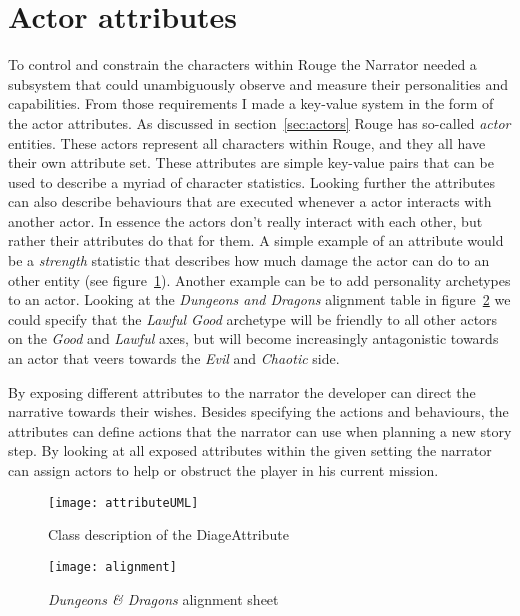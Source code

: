 \section{Actor attributes}
To control and constrain the characters within Rouge the Narrator needed a subsystem that could unambiguously observe and measure their personalities and capabilities. 
From those requirements I made a key-value system in the form of the actor attributes.
As discussed in section~\ref{sec:actors} Rouge has so-called \textit{actor} entities. These actors represent all characters within Rouge, and they all have their own attribute set. 
These attributes are simple key-value pairs that can be used to describe a myriad of character statistics. 
Looking further the attributes can also describe behaviours that are executed whenever a actor interacts with another actor.
In essence the actors don't really interact with each other, but rather their attributes do that for them.
A simple example of an attribute would be a \textit{strength} statistic that describes how much damage the actor can do to an other entity (see figure~\ref{fig:attributeUML}).
Another example can be to add personality archetypes to an actor.
Looking at the \textit{Dungeons and Dragons} alignment table in figure~\ref{fig:dnd} we could specify that the \textit{Lawful Good} archetype will be friendly to all other actors on the \textit{Good} and \textit{Lawful} axes, but will become increasingly antagonistic towards an actor that veers towards the \textit{Evil} and \textit{Chaotic} side.

By exposing different attributes to the narrator the developer can direct the narrative towards their wishes.
Besides specifying the actions and behaviours, the attributes can define actions that the narrator can use when planning a new story step. By looking at all exposed attributes within the given setting the narrator can assign actors to help or obstruct the player in his current mission.
\begin{figure}[p]
 \texttt{[image: attributeUML]}
 \caption{Class description of the DiageAttribute}\label{fig:attributeUML}
\end{figure}
\begin{figure}[p]
	\texttt{[image: alignment]}
	\caption{\textit{Dungeons \& Dragons} alignment sheet}\label{fig:dnd}
\end{figure}

